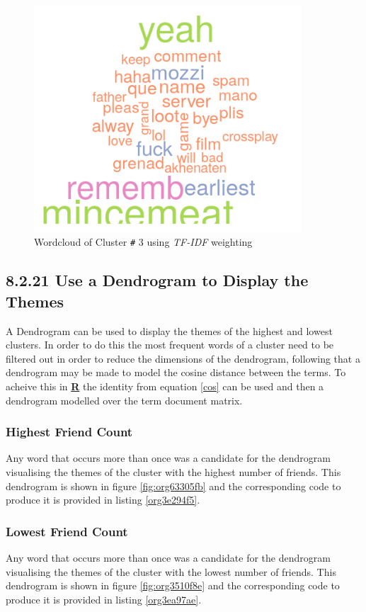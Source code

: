 \documentclass[11pt]{article}
\begin{document}
\begin{figure}[htbp]
\centering
\includegraphics[width=10cm]{./Figures/Cluster3Cloud.png}
\caption{\label{fig:org84c57b3}Wordcloud of Cluster \texttt{\#} 3 using \emph{TF-IDF} weighting}
\end{figure}

\subsection{8.2.21 Use a Dendrogram to Display the Themes}
\label{sec:org676cee8}
A Dendrogram can be used to display the themes of the highest and lowest
clusters. In order to do this the most frequent words of a cluster need to be
filtered out in order to reduce the dimensions of the dendrogram, following that
a dendrogram may be made to model the cosine distance between the terms. To
acheive this in \textbf{\textbf{\uline{R}}} the identity from equation \eqref{cos} can be used and
then a dendrogram modelled over the term document matrix.


\subsubsection{Highest Friend Count}
\label{sec:org1479462}
Any word that occurs more than once was a candidate for the dendrogram visualising the themes of the cluster with the highest number of friends. This dendrogram is shown in figure \ref{fig:org63305fb} and the corresponding code to produce it is provided in listing \ref{org3e294f5}.

\subsubsection{Lowest Friend Count}
\label{sec:orgd2900dd}
Any word that occurs more than once was a candidate for the dendrogram visualising the themes of the cluster with the lowest number of friends. This dendrogram is shown in figure \ref{fig:org3510f8e} and the corresponding code to produce it is provided in listing \ref{org3ea97ae}.
\end{document}

